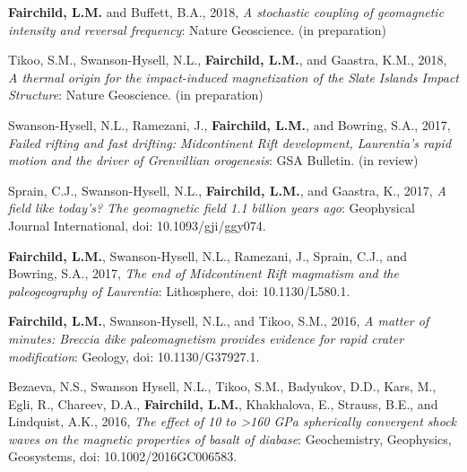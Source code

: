 \documentclass[11pt,a4paper,sans]{moderncv}        %
\begin{document}
\begin{etaremune}

\vspace{6pt}

\item{\textbf{Fairchild, L.M.} and Buffett, B.A., 2018, \textit{A stochastic coupling of geomagnetic intensity and reversal frequency}: Nature Geoscience. (in preparation)}

\vspace{3pt}

\item{Tikoo, S.M., Swanson-Hysell, N.L., \textbf{Fairchild, L.M.}, and Gaastra, K.M., 2018, \textit{A thermal origin for the impact-induced magnetization of the Slate Islands Impact Structure}: Nature Geoscience. (in preparation)}

\vspace{3pt}

\item{Swanson-Hysell, N.L., Ramezani, J., \textbf{Fairchild, L.M.}, and Bowring, S.A., 2017, \textit{Failed rifting and fast drifting: Midcontinent Rift development, Laurentia's rapid motion and the driver of Grenvillian orogenesis}: GSA Bulletin. (in review)}

\vspace{3pt}

\item{Sprain, C.J., Swanson-Hysell, N.L., \textbf{Fairchild, L.M.}, and Gaastra, K., 2017, \textit{A field like today's? The geomagnetic field 1.1 billion years ago}: Geophysical Journal International, doi: 10.1093/gji/ggy074.}

\vspace{3pt}

\item{\textbf{Fairchild, L.M.}, Swanson-Hysell, N.L., Ramezani, J., Sprain, C.J., and Bowring, S.A., 2017, \textit{The end of Midcontinent Rift magmatism and the paleogeography of Laurentia}: Lithosphere, doi: 10.1130/L580.1.}

\vspace{3pt}

\item{\textbf{Fairchild, L.M.}, Swanson-Hysell, N.L., and Tikoo, S.M., 2016, \textit{A matter of minutes: Breccia dike paleomagnetism provides evidence for rapid crater modification}: Geology, doi: 10.1130/G37927.1.}

\vspace{3pt}

\item{Bezaeva, N.S., Swanson Hysell, N.L., Tikoo, S.M., Badyukov, D.D., Kars, M., Egli, R., Chareev, D.A., \textbf{Fairchild, L.M.}, Khakhalova, E., Strauss, B.E., and Lindquist, A.K., 2016, \textit{The effect of 10 to >160 GPa spherically convergent shock waves on the magnetic properties of basalt of diabase}: Geochemistry, Geophysics, Geosystems, doi: 10.1002/2016GC006583.}


\end{etaremune}
\end{document}
